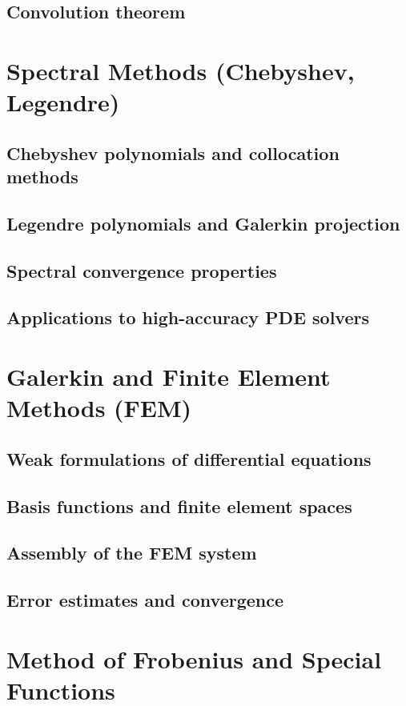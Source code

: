 \subsection{Convolution theorem}

\section{Spectral Methods (Chebyshev, Legendre)}
\subsection{Chebyshev polynomials and collocation methods}
\subsection{Legendre polynomials and Galerkin projection}
\subsection{Spectral convergence properties}
\subsection{Applications to high-accuracy PDE solvers}

\section{Galerkin and Finite Element Methods (FEM)}
\subsection{Weak formulations of differential equations}
\subsection{Basis functions and finite element spaces}
\subsection{Assembly of the FEM system}
\subsection{Error estimates and convergence}

\section{Method of Frobenius and Special Functions}
